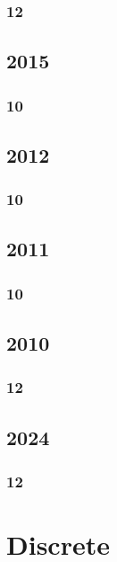 \documentclass[11pt]{book}
\begin{document}
\subsection{12}


\section{2015}
\subsection{10}


\section{2012}
\subsection{10}

%
%
%
\section{2011}
\subsection{10}


\section{2010}
\subsection{12}


\section{2024}
\subsection{12}


\chapter{Discrete}
\end{document}
